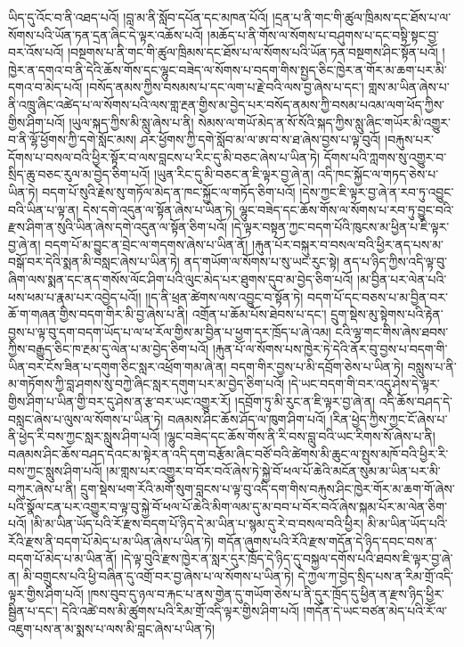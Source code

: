 ཡིད་དུ་འོང་བ་ནི་འཐད་པའོ། །བླ་མ་ནི་སློབ་དཔོན་དང་མཁན་པོའོ། །དྲན་པ་ནི་གང་གི་ཚུལ་ཁྲིམས་དང་ཐོས་པ་ལ་སོགས་པའི་ཡོན་ཏན་དྲན་ཞིང་དེ་ལྟར་འཆོས་པའོ། །མཆོད་པ་ནི་གོས་ལ་སོགས་པ་བཤུགས་པ་དང་བསྟི་སྟང་བྱ་བར་འོས་པའོ། །བསྔགས་པ་ནི་གང་གི་ཚུལ་ཁྲིམས་དང་ཐོས་པ་ལ་སོགས་པའི་ཡོན་ཏན་བསྔགས་ཤིང་སྟོན་པའོ། །ཁྱེར་ན་དགའ་བ་ནི་དེའི་ཆོས་གོས་དང་ལྷུང་བཟེད་ལ་སོགས་པ་བདག་གིས་སྤྱད་ཅིང་ཁྱེར་ན་གོར་མ་ཆག་པར་མི་དགའ་བ་མེད་པའོ། །བསོད་ནམས་ཀྱིས་བསམས་པ་དང་ལག་པ་རྗེ་བའི་ལས་བྱ་ཞེས་པ་དང་། གླས་མ་ཡིན་ཞེས་པ་ནི་འཁྲུ་ཞིང་འཚེད་པ་ལ་སོགས་པའི་ལས་གླ་རྔན་གྱིས་མ་བྱེད་པར་བསོད་ནམས་ཀྱི་བསམ་པའམ་ལག་ཕོད་ཀྱིས་གྱིས་ཤིག་པའོ། །ཡུལ་སྐད་ཀྱིས་མི་སླུ་ཞེས་པ་ནི། སེམས་ལ་གཡོ་མེད་ན་སོ་སོའི་སྐད་ཀྱིས་སླུ་ཞིང་གཡོར་མི་འགྱུར་བ་ནི་ལྷོ་ཕྱོགས་ཀྱི་དགེ་སློང་མས། ཤར་ཕྱོགས་ཀྱི་དགེ་སློབ་མ་ལ་ཨ་བ་ས་ཐ་ཞེས་བྱས་པ་ལྟ་བུའོ། །བརྐུས་པར་དོགས་པ་བསལ་བའི་ཕྱིར་སྟོར་བ་ལས་བླངས་པ་རིང་དུ་མི་བཅང་ཞེས་པ་ཡིན་ཏེ། དོགས་པའི་ཀླགས་སུ་འགྱུར་བ་སྲིད་ཆུ་བཅང་རུལ་མ་བྱེད་ཅིག་པའོ། །ཡུན་རིང་དུ་མི་བཅང་ན་ཇི་ལྟར་བྱ་ཞེ་ན། འདི་ཁང་སྐྱོང་ལ་གཏད་ཅེས་པ་ཡིན་ཏེ། བདག་པོ་སུའི་རྗེས་སུ་གཏོལ་མེད་ན་ཁང་སྐྱོང་ལ་གཏོད་ཅིག་པའོ། །དེས་ཀྱང་ཇི་ལྟར་བྱ་ཞེ་ན་རབ་ཏུ་འབྱུང་བའི་ཡིན་པ་ལྟ་ན། དེས་དགེ་འདུན་ལ་སྟོན་ཞེས་པ་ཡིན་ཏེ། ལྷུང་བཟེད་དང་ཆོས་གོས་ལ་སོགས་པ་རབ་ཏུ་བྱུང་བའི་རྫས་ཤིག་ན་སུའི་ཡིན་ཞེས་དགེ་འདུན་ལ་སྟོན་ཅིག་པའོ། །དེ་ལྟར་བསྟན་ཀྱང་བདག་པོའི་ཁུངས་མ་ཕྱིན་པ་ཇི་ལྟར་བྱ་ཞེ་ན། བདག་པོ་མ་བྱུང་ན་བྲེང་ལ་གདགས་ཞེས་པ་ཡིན་ནོ། །རྐུན་པོར་བསྐུར་བ་བསལ་བའི་ཕྱིར་ནད་པས་མ་བསྒོ་བར་དེའི་སྨན་མི་བསླང་ཞེས་པ་ཡིན་ཏེ། ནད་གཡོག་ལ་སོགས་པ་སུ་ཡང་རུང་སྟེ། ནད་པ་ཉིད་ཀྱིས་འདི་ལྟ་བུ་ཞིག་ལས་སྨན་དང་ནད་གསོས་ལོང་ཤིག་པའི་ལུང་མེད་པར་ཐུགས་དུབ་མ་བྱེད་ཅིག་པའོ། །མ་བྱིན་པར་ལེན་པའི་ཕས་ཕམ་པ་རྣམ་པར་འབྱེད་པའོ།། །།ད་ནི་ཕྲན་ཚེགས་ལས་འབྱུང་བ་སྟོན་ཏེ། བདག་པོ་དང་བཅས་པ་མ་བྱིན་བར་ཆོ་ག་གཞན་གྱིས་བདག་གིར་མི་བྱ་ཞེས་པ་ནི། འགྲོན་པ་ཆོམ་པོས་ཐེབས་པ་དང་། དྲུག་སྡེས་མུ་སྟེགས་པའི་རྟེན་བྱས་པ་ལྟ་བུ་དག་བདག་ཡོད་པ་ལ་ཕ་རོལ་གྱིས་མ་བྱིན་པ་ཕྱག་དར་ཁྲོད་པ་ཞེ་འམ། ངའི་ལྷ་གང་གིས་ཞེས་ཐབས་ཀྱིས་བརྒྱུད་ཅིང་ཁ་རྔམ་དུ་ལེན་པ་མ་བྱེད་ཅིག་པའོ། །རྐུན་པོ་ལ་སོགས་པས་ཁྱེར་ཏེ་དེའི་ནོར་བུ་བྱས་པ་བདག་གི་ཡིན་བར་ངོས་ཟིན་པ་དགུག་ཅིང་སླར་འཕྲོག་གམ་ཞེ་ན། བདག་གིར་བྱས་པ་མི་དབྲོག་ཅེས་པ་ཡིན་ཏེ། བསླུས་པ་ནི་མ་གཏོགས་ཀྱི་བླ་ཤགས་སུ་བཀྱེ་ཞིང་སླར་དགུག་པར་མ་བྱེད་ཅིག་པའོ། །དེ་ཡང་བདག་གི་བར་འདུ་ཤེས་དེ་ལྟར་གྱིས་ཤིག་པ་ཡིན་གྱི་བར་དུ་ཤེས་ན་རྩ་བར་ཡང་འགྱུར་རོ། །དབྲོག་ཏུ་མི་རུང་ན་ཇི་ལྟར་བྱ་ཞེ་ན། འདི་ཆོས་བཤད་དེ་བསླང་ཞེས་པ་ལུས་ལ་སོགས་པ་ཡིན་ཏེ། བཞམས་ཤིང་ཆོས་ཤོད་ལ་ཁུག་ཤིག་པའོ། །རིན་ཕྱེད་ཀྱིས་ཀྱང་ངོ་ཞེས་པ་ནི་ཕྱེད་རི་བས་ཀྱང་སླར་སླུས་ཤིག་པའོ། །ལྷུང་བཟེད་དང་ཆོས་གོས་ནི་རི་བས་བླུ་བའི་ཡང་རིགས་སོ་ཞེས་པ་ནི། བཞམས་ཤིང་ཆོས་བཤད་དེའང་མ་སྟེར་ན་འདི་དག་བརྩོམ་ཞིང་བཙོ་བའི་ཚེགས་མི་ཆུང་ལ་སྤུས་མཁོ་བའི་ཕྱིར་རི་བས་ཀྱང་སླུས་ཤིག་པའོ། །མ་གླས་པར་འགྱུར་བ་བོར་བའོ་ཞེས་ཏེ་སྐྱེ་བོ་ཕལ་པོ་ཆེའི་མངོན་སུམ་མ་ཡིན་པར་མི་བཀུར་ཞེས་པ་ནི། དྲུག་སྡེས་ཕག་རོའི་མགོ་སུག་བླངས་པ་ལྟ་བུ་འདི་དག་གིས་བརྐུས་ཤིང་ཁྱེར་གོར་མ་ཆག་གོ་ཞེས་པའི་སྣོལ་ངན་པར་འགྱུར་བ་ལྟ་བུ་སྐྱེ་བོ་ཕལ་པོ་ཆེའི་མིག་ལམ་དུ་མ་བབ་པ་བོར་བའོ་ཞེས་སྐམ་པོར་མ་ལེན་ཅིག་པའོ། །མི་མ་ཡིན་ཡོད་པའི་རོ་རྫས་བདག་པོ་ཉིད་དེ་མ་ཡིན་པ་སྙམ་དུ་རེ་བ་བསལ་བའི་ཕྱིར། མི་མ་ཡིན་ཡོད་པའི་རོའི་རྫས་ནི་བདག་པོ་མེད་པ་མ་ཡིན་ཞེས་པ་ཡིན་ཏེ། གདོན་ཞུགས་པའི་རོའི་རྫས་གདོན་དེ་ཉིད་དབང་བས་ན་བདག་པོ་མེད་པ་མ་ཡིན་ནོ། །དེ་ལྟ་བུའི་རྫས་ཁྱེར་ན་སླར་དུར་ཁྲོད་དེ་ཉིད་དུ་བསྐྱལ་དགོས་པའི་ཐབས་ཇི་ལྟར་བྱ་ཞེ་ན། མི་བགྲུངས་པའི་ཕྱི་བཞིན་དུ་འགྲོ་བར་བྱ་ཞེས་པ་ལ་སོགས་པ་ཡིན་ཏེ། དེ་ཀྱལ་ཀ་བྱེད་སྲིད་པས་ན་རིམ་གྲོ་འདི་ལྟར་གྱིས་ཤིག་པའོ། །ཁས་བུབ་དུ་ཉལ་བ་རྐང་པ་ནས་གྱེན་དུ་གཡོག་ཅེས་པ་ནི་དུར་ཁྲོད་དུ་ཕྱིན་ན་རྫས་ཉིད་ཕྱིར་སྦྱིན་པ་དང་། དེའི་འཚེ་བས་མི་ཚུགས་པའི་རིམ་གྲོ་འདི་ལྟར་གྱིས་ཤིག་པའོ། །གདོན་དེ་ཡང་བཙན་མེད་པའི་རོ་ལ་འཇུག་པས་ན་མ་སྨས་པ་ལས་མི་བླང་ཞེས་པ་ཡིན་ཏེ། 
